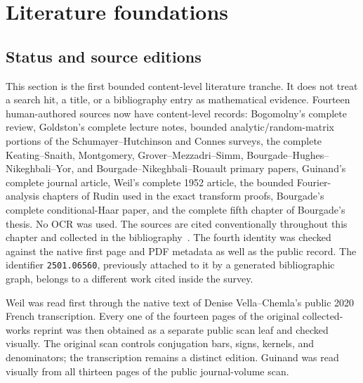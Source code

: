 \section{Literature foundations}
\label{sec:literature-foundations}

\subsection{Status and source editions}

This section is the first bounded content-level literature tranche.  It does not treat a
search hit, a title, or a bibliography entry as mathematical evidence.  Fourteen human-authored
sources now have content-level records: Bogomolny's complete review, Goldston's complete
lecture notes, bounded analytic/random-matrix portions of the Schumayer--Hutchinson and
Connes surveys, the complete Keating--Snaith, Montgomery, Grover--Mezzadri--Simm,
Bourgade--Hughes--Nikeghbali--Yor, and Bourgade--Nikeghbali--Rouault primary papers,
Guinand's complete journal article, Weil's complete 1952 article, the bounded
Fourier-analysis chapters of Rudin used in the exact transform proofs, Bourgade's complete
conditional-Haar paper, and the complete fifth chapter of Bourgade's thesis.  No OCR was
used.  The sources are cited conventionally throughout this chapter and collected in the
bibliography~\cite{bogomolny2007,goldston2004,schumayerHutchinson2011,connes2026,
keatingSnaith2000,montgomery1973,guinand1948,weil1952,rudin1990,
groverMezzadriSimm2026,bourgadeHughesNikeghbaliYor2007,
bourgadeNikeghbaliRouault2008,bourgadeConditionalHaar2009,bourgadeThesis2010}.
The fourth identity was checked against the native first page and PDF metadata as well as
the public record.  The identifier \texttt{2501.06560}, previously attached to it by a
generated bibliographic graph, belongs to a different work cited inside the survey.

Weil was read first through the native text of Denise Vella--Chemla's public 2020 French
transcription.  Every one of the fourteen pages of the original collected-works reprint was
then obtained as a separate public scan leaf and checked visually.  The original scan controls
conjugation bars, signs, kernels, and denominators; the transcription remains a distinct
edition.  Guinand was read visually from all thirteen pages of the public journal-volume scan.

